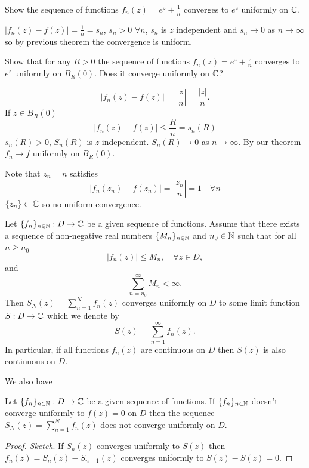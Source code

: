 \documentclass[10pt, a4paper]{article}
\begin{document}
\begin{example}
    Show the sequence of functions $f_n(z) = e ^ z + \frac{1}{n}$ converges to $e ^ z$ uniformly on $\mathbb{C}$.

    \begin{solution}
        $|f_n(z) - f(z)| = \frac{1}{n} = s_n$,
        $s_n > 0$ $\forall n$,
        $s_n$ is $z$ independent and $s_n \to 0$ as $n \to \infty$ so by previous theorem the convergence is uniform.
    \end{solution}
\end{example}

\begin{example}
    Show that for any $R > 0$ the sequence of functions $f_n(z) = e ^ z + \frac{z}{n}$ converges to $e ^ z$ uniformly on $B_R(0)$.
    Does it converge uniformly on $\mathbb{C}$?

    \begin{solution}
        \[
        |f_n(z) - f(z)| = \left|\frac{z}{n}\right| = \frac{|z|}{n}.
        \]
        If $z \in B_R(0)$
        \[
        |f_n(z) - f(z)| \leq \frac{R}{n} = s_n(R)
        \]
        $s_n(R) > 0$,
        $S_n(R)$ is $z$ independent.
        $S_n(R) \to 0$ as $n \to \infty$.
        By our theorem $f_n \to f$ uniformly on $B_R(0)$.

        Note that $z_n = n$ satisfies
        \[
        |f_n(z_n) - f(z_n)| = \left|\frac{z_n}{n}\right| = 1\quad \forall n
        \]
        $\{z_n\} \subset \mathbb{C}$ so no uniform convergence.
    \end{solution}
\end{example}

\begin{theorem}
    Let $\{f_n\}_{n \in \mathbb{N}} : D \to \mathbb{C}$ be a given sequence of functions.
    Assume that there exists a sequence of non-negative real numbers $\{M_n\}_{n \in \mathbb{N}}$ and $n_0 \in \mathbb{N}$ such that for all $n \geq n_0$
    \[
    |f_n(z)| \leq M_n,\quad \forall z \in D,
    \]
    and
    \[
    \sum_{n = n_0}^{\infty}M_n < \infty.
    \]
    Then $S_N(z) = \sum_{n = 1}^{N}f_n(z)$ converges uniformly on $D$ to some limit function $S : D \to \mathbb{C}$ which we denote by
    \[
    S(z) = \sum_{n = 1}^{\infty}f_n(z).
    \]
    In particular,
    if all functions $f_n(z)$ are continuous on $D$ then $S(z)$ is also continuous on $D$.
\end{theorem}

We also have
\begin{theorem}
    Let $\{f_n\}_{n \in \mathbb{N}} : D \to \mathbb{C}$ be a given sequence of functions.
    If $\{f_n\}_{n \in \mathbb{N}}$ doesn't converge uniformly to $f(z) = 0$ on $D$ then the sequence $S_N(z) = \sum_{n = 1}^{N}f_n(z)$ does not converge uniformly on $D$.

    \begin{proof}
        \textit{Sketch}.
        If $S_n(z)$ converges uniformly to $S(z)$ then $f_n(z) = S_n(z) - S_{n - 1}(z)$ converges uniformly to $S(z) - S(z) = 0$.
    \end{proof}
\end{theorem}
\end{document}
